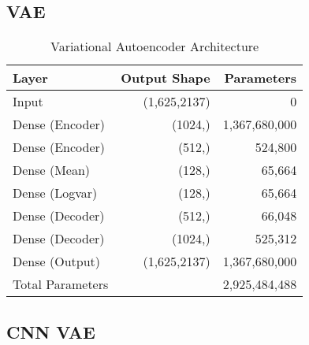 \subsection{VAE}
\label{app:a-vae}

\begin{table}[!h]
    \centering
    \begin{tabular}{lrr}
        \toprule
        Layer & Output Shape & Parameters \\
        \midrule
        Input & (1,625,2137) & 0 \\
        Dense (Encoder) & (1024,) & 1,367,680,000 \\
        Dense (Encoder) & (512,) & 524,800 \\
        Dense (Mean) & (128,) & 65,664 \\
        Dense (Logvar) & (128,) & 65,664 \\
        Dense (Decoder) & (512,) & 66,048 \\
        Dense (Decoder) & (1024,) & 525,312 \\
        Dense (Output) & (1,625,2137) & 1,367,680,000 \\
        \midrule
        Total Parameters & & 2,925,484,488 \\
        \bottomrule
    \end{tabular}
    \caption{Variational Autoencoder Architecture}
    \label{tab:vae}
\end{table}



\subsection{CNN VAE}
\label{app:a-cvae}

